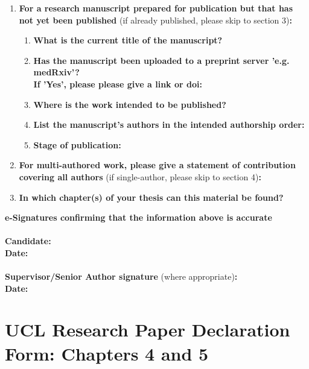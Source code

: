 \begin{enumerate}
\begin{enumerate}
        \end{enumerate}
        \item \textbf{For a research manuscript prepared for publication but that has not yet been published} (if already published, please skip to section 3)\textbf{:}
        \begin{enumerate}\itemsep0em
            \item \textbf{What is the current title of the manuscript?}
            \item \textbf{Has the manuscript been uploaded to a preprint server 'e.g. medRxiv'? 
            \\
            If 'Yes', please please give a link or doi:}
            \item \textbf{Where is the work intended to be published?}
            \item \textbf{List the manuscript's authors in the intended authorship order:}
            \item \textbf{Stage of publication:}
        \end{enumerate}
        
        \item \textbf{For multi-authored work, please give a statement of contribution covering all authors} (if single-author, please skip to section 4)\textbf{:}
        \item \textbf{In which chapter(s) of your thesis can this material be found?}
    \end{enumerate}
    
    \textbf{e-Signatures confirming that the information above is accurate}\\
    \textbf{}\\ 
    \textbf{Candidate:}\\
    \textbf{Date:}\\
    \textbf{}\\
    \textbf{Supervisor/Senior Author signature} (where appropriate)\textbf{:}\\
    \textbf{Date:}	

\newpage	
\section*{UCL Research Paper Declaration Form: Chapters 4 and 5}

